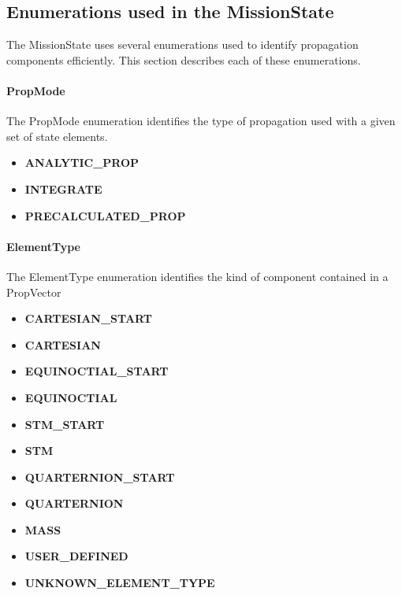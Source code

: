 %
%

\subsection{Enumerations used in the MissionState}

The MissionState uses several enumerations used to identify propagation components efficiently.
This section describes each of these enumerations.

\paragraph{PropMode}  The PropMode enumeration identifies the type of propagation used with a given
set of state elements.

\begin{itemize}
\item \textbf{ANALYTIC\_PROP}
\item \textbf{INTEGRATE}
\item \textbf{PRECALCULATED\_PROP}
\end{itemize}

\paragraph{ElementType}  The ElementType enumeration identifies the kind of component contained in
a PropVector

\begin{itemize}
\item \textbf{CARTESIAN\_START}
\item \textbf{CARTESIAN}
\item \textbf{EQUINOCTIAL\_START}
\item \textbf{EQUINOCTIAL}
\item \textbf{STM\_START}
\item \textbf{STM}
\item \textbf{QUARTERNION\_START}
\item \textbf{QUARTERNION}
\item \textbf{MASS}
\item \textbf{USER\_DEFINED}
\item \textbf{UNKNOWN\_ELEMENT\_TYPE}
\end{itemize}

